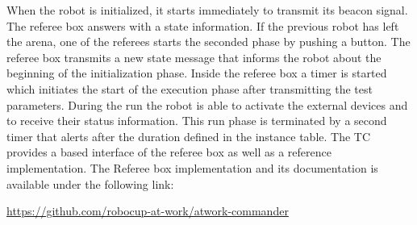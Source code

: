 When the robot is initialized, it starts immediately to transmit its beacon
signal. The referee box answers with a state information. If the previous robot
has left the arena, one of the referees starts the seconded phase by pushing a
button. The referee box transmits a new state message that informs the robot
about the beginning of the initialization phase. Inside the referee box a
timer is started which initiates the start of the execution phase after
transmitting the test parameters. During the run the robot is able to activate
the external devices and to receive their status information. This run phase is
terminated by a second timer that alerts after the duration defined in the
instance table.
%
% 
The TC provides a  based interface of the referee box as well as
a reference implementation.
The Referee box implementation and its documentation is available under the following link:
\begin{center}
\url{https://github.com/robocup-at-work/atwork-commander}

\end{center}




